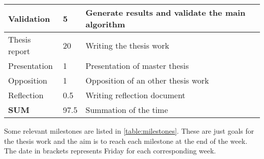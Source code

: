 \begin{table}[H]
\begin{tabular}{|p{}|p{}|p{}|}
	Validation                 & 5                 & Generate results and validate the main algorithm            \\ \hline
	Thesis report              & 20                & Writing the thesis work                                     \\ \hline
	Presentation               & 1                 & Presentation of master thesis                               \\ \hline
	Opposition                 & 1                 & Opposition of an other thesis work                          \\ \hline
	Reflection                 & 0.5               & Writing reflection document                                 \\ \hline
	\textbf{SUM}               & 97.5                & Summation of the time                                       \\ \hline
\end{tabular}
\end{table}

Some relevant milestones are listed in \cref{table:milestones}. These are just goals for the thesis work and the aim is to reach each milestone at the end of the week. The date in brackets represents Friday for each corresponding week. 

